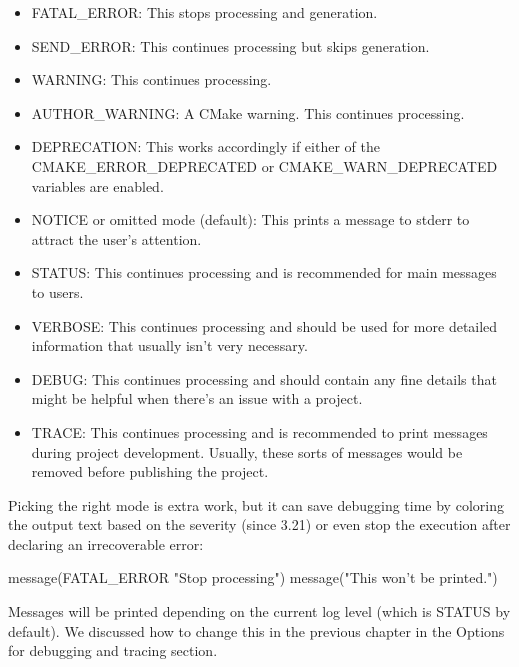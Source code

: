 \begin{itemize}
\item
FATAL\_ERROR: This stops processing and generation.

\item
SEND\_ERROR: This continues processing but skips generation.

\item
WARNING: This continues processing.

\item
AUTHOR\_WARNING: A CMake warning. This continues processing.

\item
DEPRECATION: This works accordingly if either of the CMAKE\_ERROR\_DEPRECATED or CMAKE\_WARN\_DEPRECATED variables are enabled.

\item
NOTICE or omitted mode (default): This prints a message to stderr to attract the user’s attention.

\item
STATUS: This continues processing and is recommended for main messages to users.

\item
VERBOSE: This continues processing and should be used for more detailed information that usually isn’t very necessary.

\item
DEBUG: This continues processing and should contain any fine details that might be helpful when there’s an issue with a project.

\item
TRACE: This continues processing and is recommended to print messages during project development. Usually, these sorts of messages would be removed before publishing the project.
\end{itemize}

Picking the right mode is extra work, but it can save debugging time by coloring the output text based on the severity (since 3.21) or even stop the execution after declaring an irrecoverable error:


\begin{cmake}
message(FATAL_ERROR "Stop processing")
message("This won't be printed.")
\end{cmake}

Messages will be printed depending on the current log level (which is STATUS by default). We discussed how to change this in the previous chapter in the Options for debugging and tracing section.

